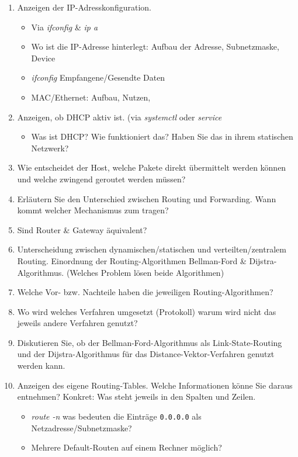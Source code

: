 \documentclass[a4paper,twoside,12pt]{article}
\begin{document}
\begin{description}
\begin{enumerate}
	\item Anzeigen der IP-Adresskonfiguration.
	\begin{itemize}
		\item Via \emph{ifconfig} \& \emph{ip a}
		\item Wo ist die IP-Adresse hinterlegt: Aufbau der Adresse, Subnetzmaske, Device
		\item \emph{ifconfig} Empfangene/Gesendte Daten
		\item MAC/Ethernet: Aufbau, Nutzen,
	\end{itemize}
	\item Anzeigen, ob DHCP aktiv ist. (via \emph{systemctl} oder \emph{service}
	\begin{itemize}
		\item Was ist DHCP? Wie funktioniert das? Haben Sie das in ihrem statischen Netzwerk?
	\end{itemize}
	\item Wie entscheidet der Host, welche Pakete direkt übermittelt werden können und welche zwingend geroutet werden müssen?
	\item Erläutern Sie den Unterschied zwischen Routing und Forwarding. Wann kommt welcher Mechanismus zum tragen?
	\item Sind Router \& Gateway äquivalent?
	\item Unterscheidung zwischen dynamischen/statischen und verteilten/zentralem Routing. Einordnung der Routing-Algorithmen Bellman-Ford \& Dijstra-Algorithmus. (Welches Problem lösen beide Algorithmen)
	\item Welche Vor- bzw. Nachteile haben die jeweiligen Routing-Algorithmen?
	\item Wo wird welches Verfahren umgesetzt (Protokoll) warum wird nicht das jeweils andere Verfahren genutzt?
	\item Diskutieren Sie, ob der Bellman-Ford-Algorithmus als Link-State-Routing und der Dijstra-Algorithmus für das Distance-Vektor-Verfahren genutzt werden kann.
	\item Anzeigen des eigene Routing-Tables. Welche Informationen könne Sie daraus entnehmen? Konkret: Was steht jeweils in den Spalten und Zeilen.
	\begin{itemize}
		\item \emph{route -n} was bedeuten die Einträge \texttt{0.0.0.0} als Netzadresse/Subnetzmaske?
		\item Mehrere Default-Routen auf einem Rechner möglich?
	\end{itemize}

\end{enumerate}
\end{description}
\end{document}
